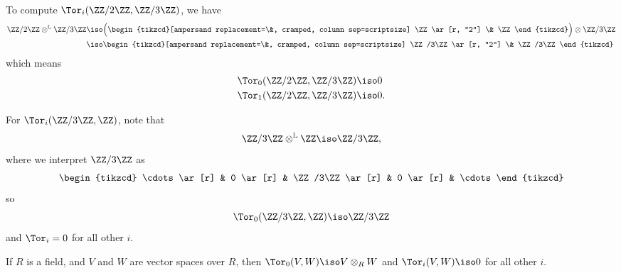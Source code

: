 \documentclass{standalone}
\begin{document}
\begin{example}
  To compute \(\Tor_i(\ZZ/2\ZZ, \ZZ/3\ZZ)\), we have
  \begin{align*}
    \ZZ/2\ZZ \otimes^{\mathbb L} \ZZ/3\ZZ
      &\iso \Big(
        \begin{tikzcd}[ampersand replacement=\&,
                       cramped, column sep=scriptsize]
        	\ZZ \ar[r, "2"] \& \ZZ
        \end{tikzcd}
      \Big) \otimes \ZZ/3\ZZ \\
      &\iso \begin{tikzcd}[ampersand replacement=\&,
                           cramped, column sep=scriptsize]
        	\ZZ/3\ZZ \ar[r, "2"] \& \ZZ/3\ZZ
        \end{tikzcd}
  \end{align*}
  which means
  \begin{align*}
    \Tor_0(\ZZ/2\ZZ, \ZZ/3\ZZ) &\iso 0 \\
    \Tor_1(\ZZ/2\ZZ, \ZZ/3\ZZ) &\iso 0.
  \end{align*}
\end{example}

\begin{example}
  For \(\Tor_i(\ZZ/3\ZZ, \ZZ)\), note that
  \[
    \ZZ/3\ZZ \otimes^{\mathbb L} \ZZ \iso \ZZ/3\ZZ,
  \]
  where we interpret \(\ZZ/3\ZZ\) as
  \[
    \begin{tikzcd}
    	\cdots \ar[r] &
    		0 \ar[r] &
    		\ZZ/3\ZZ \ar[r] &
    		0 \ar[r] &
    		\cdots
    \end{tikzcd}
  \]
  so
  \[
    \Tor_0(\ZZ/3\ZZ, \ZZ) \iso \ZZ/3\ZZ
  \]
  and \(\Tor_i = 0\) for all other \(i\).
\end{example}

\begin{example}
  If \(R\) is a field, and \(V\) and \(W\) are vector spaces over \(R\),
  then \(\Tor_0(V, W) \iso V \otimes_R W\) and \(\Tor_i(V, W) \iso 0\)
  for all other \(i\).
\end{example}
\end{document}
